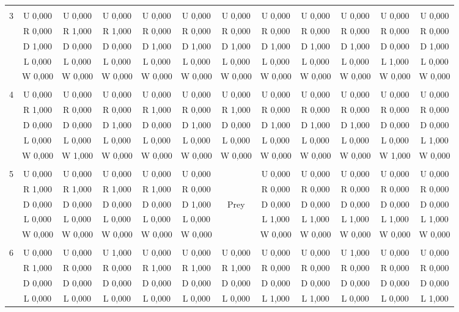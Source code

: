 \documentclass{article}
\begin{document}
\begin{table}[htbp]
\begin{footnotesize}
\begin{tabular}{c|c|c|c|c|c|c|c|c|c|c|c|}
\hline \\
3&U 0,000&U 0,000&U 0,000&U 0,000&U 0,000&U 0,000&U 0,000&U 0,000&U 0,000&U 0,000&U 0,000\\
&R 0,000&R 1,000&R 1,000&R 0,000&R 0,000&R 0,000&R 0,000&R 0,000&R 0,000&R 0,000&R 0,000\\
&D 1,000&D 0,000&D 0,000&D 1,000&D 1,000&D 1,000&D 1,000&D 1,000&D 1,000&D 0,000&D 1,000\\
&L 0,000&L 0,000&L 0,000&L 0,000&L 0,000&L 0,000&L 0,000&L 0,000&L 0,000&L 1,000&L 0,000\\
&W 0,000&W 0,000&W 0,000&W 0,000&W 0,000&W 0,000&W 0,000&W 0,000&W 0,000&W 0,000&W 0,000\\
\hline \\
4&U 0,000&U 0,000&U 0,000&U 0,000&U 0,000&U 0,000&U 0,000&U 0,000&U 0,000&U 0,000&U 0,000\\
&R 1,000&R 0,000&R 0,000&R 1,000&R 0,000&R 1,000&R 0,000&R 0,000&R 0,000&R 0,000&R 0,000\\
&D 0,000&D 0,000&D 1,000&D 0,000&D 1,000&D 0,000&D 1,000&D 1,000&D 1,000&D 0,000&D 0,000\\
&L 0,000&L 0,000&L 0,000&L 0,000&L 0,000&L 0,000&L 0,000&L 0,000&L 0,000&L 0,000&L 1,000\\
&W 0,000&W 1,000&W 0,000&W 0,000&W 0,000&W 0,000&W 0,000&W 0,000&W 0,000&W 1,000&W 0,000\\
\hline \\
5&U 0,000&U 0,000&U 0,000&U 0,000&U 0,000&&U 0,000&U 0,000&U 0,000&U 0,000&U 0,000\\
&R 1,000&R 1,000&R 1,000&R 1,000&R 0,000&&R 0,000&R 0,000&R 0,000&R 0,000&R 0,000\\
&D 0,000&D 0,000&D 0,000&D 0,000&D 1,000&Prey&D 0,000&D 0,000&D 0,000&D 0,000&D 0,000\\
&L 0,000&L 0,000&L 0,000&L 0,000&L 0,000&&L 1,000&L 1,000&L 1,000&L 1,000&L 1,000\\
&W 0,000&W 0,000&W 0,000&W 0,000&W 0,000&&W 0,000&W 0,000&W 0,000&W 0,000&W 0,000\\
\hline \\
6&U 0,000&U 0,000&U 1,000&U 0,000&U 0,000&U 0,000&U 0,000&U 0,000&U 1,000&U 0,000&U 0,000\\
&R 1,000&R 0,000&R 0,000&R 1,000&R 1,000&R 1,000&R 0,000&R 0,000&R 0,000&R 0,000&R 0,000\\
&D 0,000&D 0,000&D 0,000&D 0,000&D 0,000&D 0,000&D 0,000&D 0,000&D 0,000&D 0,000&D 0,000\\
&L 0,000&L 0,000&L 0,000&L 0,000&L 0,000&L 0,000&L 1,000&L 1,000&L 0,000&L 0,000&L 1,000\\

\end{tabular}
\end{footnotesize}
\end{table}
\end{document}
